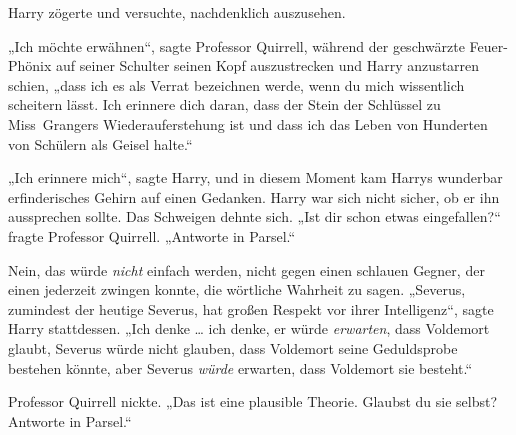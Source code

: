 Harry zögerte und versuchte, nachdenklich auszusehen.

„Ich möchte erwähnen“, sagte Professor Quirrell, während der geschwärzte Feuer-Phönix auf seiner Schulter seinen Kopf auszustrecken und Harry anzustarren schien,
„dass ich es als Verrat bezeichnen werde, wenn du mich wissentlich scheitern lässt. Ich erinnere dich daran, dass der Stein der Schlüssel zu Miss~Grangers Wiederauferstehung ist und dass ich das Leben von Hunderten von Schülern als Geisel halte.“

„Ich erinnere mich“, sagte Harry, und in diesem Moment kam Harrys wunderbar erfinderisches Gehirn auf einen Gedanken.
Harry war sich nicht sicher, ob er ihn aussprechen sollte.
Das Schweigen dehnte sich.
„Ist dir schon etwas eingefallen?“ fragte Professor Quirrell.
„Antworte in Parsel.“

Nein, das würde \emph{nicht} einfach werden, nicht gegen einen schlauen Gegner, der einen jederzeit zwingen konnte, die wörtliche Wahrheit zu sagen.
„Severus, zumindest der heutige Severus, hat großen Respekt vor ihrer Intelligenz“, sagte Harry stattdessen.
„Ich denke … ich denke, er würde \emph{erwarten}, dass Voldemort glaubt, Severus würde nicht glauben, dass Voldemort seine Geduldsprobe bestehen könnte, aber Severus \emph{würde} erwarten, dass Voldemort sie besteht.“

Professor Quirrell nickte.
„Das ist eine plausible Theorie. Glaubst du sie selbst? Antworte in Parsel.“

